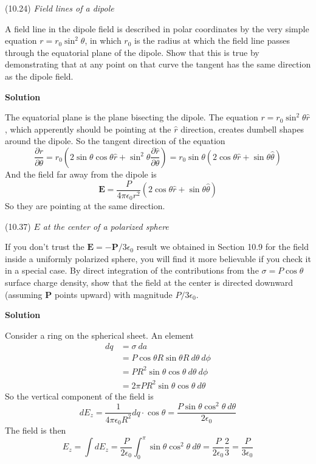 \documentclass{article}
\begin{document}
\begin{homeworkProblem}
	(10.24) \textit{Field lines of a dipole}

	A field line in the dipole field is described in polar coordinates by the very simple equation $r=r_0\sin^2\theta$, in which $r_0$ is the radius at which the field line passes through the equatorial plane of the dipole. Show that this is true by demonstrating that at any point on that curve the tangent has the same direction as the dipole field.

	\textbf{Solution}

	The equatorial plane is the plane bisecting the dipole. The equation $r=r_0\sin^2\theta\hat{r}$, which apperently should be pointing at the $\hat{r}$ direction, creates dumbell shapes around the dipole. So the tangent direction of the equation
	\[
		\frac{\partial r}{\partial\theta}=r_0\left(2\sin\theta\cos\theta\hat{r}+\sin^2\theta\frac{\partial\hat{r}}{\partial\theta}\right)=r_0\sin\theta\left(2\cos\theta\hat{r}+\sin\theta\hat{\theta}\right)
	\]
	And the field far away from the dipole is
	\[
		\mathbf{E}=\frac{P}{4\pi\epsilon_0r^2}\left(2\cos\theta\hat{r}+\sin\theta\hat{\theta}\right)
	\]
	So they are pointing at the same direction.
\end{homeworkProblem}


\begin{homeworkProblem}
	(10.37) \textit{$E$ at the center of a polarized sphere}

	If you don't trust the $\mathbf{E}=-\mathbf{P}/3\epsilon_0$ result we obtained in Section 10.9 for the field inside a uniformly polarized sphere, you will find it more believable if you check it in a special case. By direct integration of the contributions from the $\sigma=P\cos\theta$ surface charge density, show that the field at the center is directed downward (assuming $\mathbf{P}$ points upward) with magnitude $P/3\epsilon_0$.

	\textbf{Solution}

	Consider a ring on the spherical sheet. An element
	\begin{align*}
		dq&=\sigma\ da \\
		&=P\cos\theta R\sin\theta R\ d\theta\ d\phi \\
		&=PR^2\sin\theta\cos\theta\ d\theta\ d\phi \\
		&=2\pi PR^2\sin\theta\cos\theta\ d\theta
	\end{align*}
	So the vertical component of the field is
	\[
		dE_z=\frac{1}{4\pi\epsilon_0R^2}dq\cdot\cos\theta=\frac{P\sin\theta\cos^2\theta\ d\theta}{2\epsilon_0}
	\]
	The field is then
	\[
		E_z=\int dE_z=\frac{P}{2\epsilon_0}\int_0^\pi\sin\theta\cos^2\theta\ d\theta=\frac{P}{2\epsilon_0}\frac{2}{3}=\frac{P}{3\epsilon_0}
	\]
\end{homeworkProblem}
\end{document}
